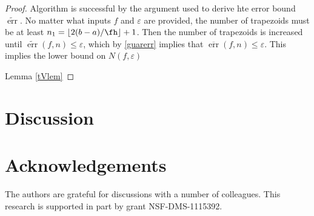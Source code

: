 \documentclass[]{article}
\DeclareMathOperator{\err}{err}
\newcommand{\oerr}{\overline{\err}}
\newcommand{\terr}{\widetilde{\err}}
\theoremstyle{definition}
\theoremstyle{remark}
\newcommand{\hcut}{\fh}
\begin{document}
\begin{proof} Algorithm is successful by the argument used to derive hte error bound $\terr$.  No matter what inputs $f$ and $\varepsilon$ are provided, the number of trapezoids must be at least $n_1 = \left \lfloor 2(b-a)/\hcut \right \rfloor +1$.  Then the number of trapezoids is increased until $\terr(f,n) \le \varepsilon$, which by \eqref{guarerr} implies that $\oerr(f,n) \le \varepsilon$.  This implies the lower bound on $N(f,\varepsilon)$ 

Lemma  \ref{tVlem}

\end{proof}






\section{Discussion} \label{discusssec}

\section{Acknowledgements}  The authors are grateful for discussions with a number of colleagues. This research is supported in part by grant NSF-DMS-1115392.


\end{document}
